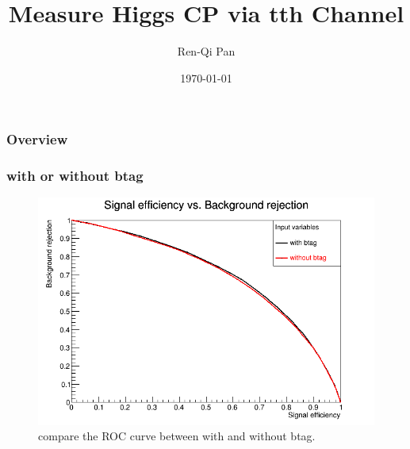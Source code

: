 \documentclass{beamer}
\title[tth]{Measure Higgs CP via tth Channel} %
\author{Ren-Qi Pan} %
\institute[ZJU] %
{
Zhejiang Institute of Modern Physics\\ %
\medskip
\textit{renqipan@zju.edu.cn} %
}
\date{\today} %
\begin{document}
\begin{frame}
\titlepage %
\end{frame}

\begin{frame}
\frametitle{Overview} %
\tableofcontents %
\end{frame}


\begin{frame}
\frametitle{with or without btag}
\begin{figure}
\includegraphics[scale=0.25]{./figures/ROC_Curve_btag.png}
\caption{compare the ROC curve between with and without btag.}
\end{figure}
\end{frame}
\end{document}
